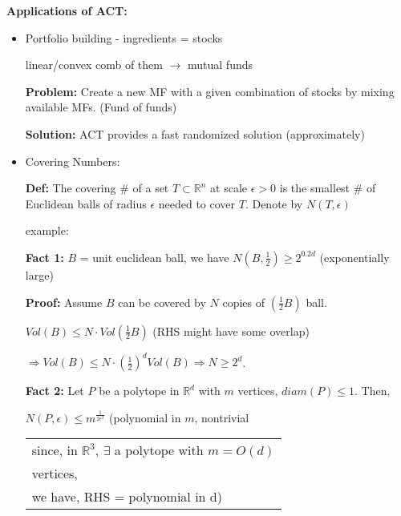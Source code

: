 \documentclass[12pt]{article}
\begin{document}
\textbf{Applications of ACT:}
\begin{itemize}
    \item Portfolio building - ingredients = stocks
    
    linear/convex comb of them $\rightarrow$ mutual funds
    
    \textbf{Problem:} Create a new MF with a given combination of stocks by mixing available MFs. (Fund of funds)
    
    \textbf{Solution:} ACT provides a fast randomized solution (approximately)
    
    \item Covering Numbers:
    
    \textbf{Def:} The covering \# of a set $T \subset \mathbb{R}^n$ at scale $\epsilon > 0$ is the smallest \# of Euclidean balls of radius $\epsilon$ needed to cover $T$. Denote by $N(T,\epsilon)$
    
    example:
    
    \textbf{Fact 1:} $B$ = unit euclidean ball, we have $N(B, \frac{1}{2}) \geq 2^{0.2d}$ \hspace{2cm} (exponentially large)
    
    \textbf{Proof:} Assume $B$ can be covered by $N$ copies of $(\frac{1}{2}B)$ ball.
    
    $Vol(B) \leq N \cdot Vol(\frac{1}{2}B)$ \hspace{2cm} (RHS might have some overlap)
    
    $\Rightarrow Vol(B) \leq N \cdot (\frac{1}{2})^d Vol(B) \Rightarrow N \geq 2^d$.
    
    \textbf{Fact 2:} Let $P$ be a polytope in $\mathbb{R}^d$ with $m$ vertices, $diam(P) \leq 1$. Then,
    
    $N(P, \epsilon) \leq m^{\frac{1}{2\epsilon^2}}$ \hspace{1cm} (polynomial in $m$, nontrivial
    \begin{tabular}{l}
    since, in $\mathbb{R}^3$, $\exists$ a polytope with $m = O(d)$ \\
    vertices, \\
    we have, RHS = polynomial in d)
    \end{tabular}
    

\end{itemize}
\end{document}
